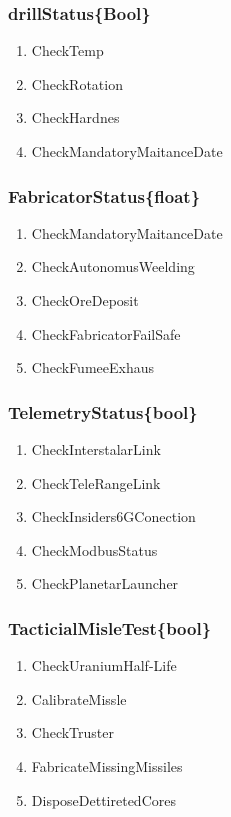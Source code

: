 \documentclass{article}
\begin{document}
\subsubsection{drillStatus\{Bool\}}
\begin{enumerate}
    \item CheckTemp
    \item CheckRotation
    \item CheckHardnes
    \item CheckMandatoryMaitanceDate
\end{enumerate}

\subsubsection{FabricatorStatus\{float\}}
\begin{enumerate}
    \item CheckMandatoryMaitanceDate
    \item CheckAutonomusWeelding
    \item CheckOreDeposit
    \item CheckFabricatorFailSafe
    \item CheckFumeeExhaus
\end{enumerate}

\subsubsection{TelemetryStatus\{bool\}}
\begin{enumerate}
    \item CheckInterstalarLink
    \item CheckTeleRangeLink
    \item CheckInsiders6GConection
    \item CheckModbusStatus
    \item CheckPlanetarLauncher
\end{enumerate}

\subsubsection{TacticialMisleTest\{bool\}}

\begin{enumerate}
    \item CheckUraniumHalf-Life
    \item CalibrateMissle
    \item CheckTruster
    \item FabricateMissingMissiles
    \item DisposeDettiretedCores
\end{enumerate}
\end{document}
